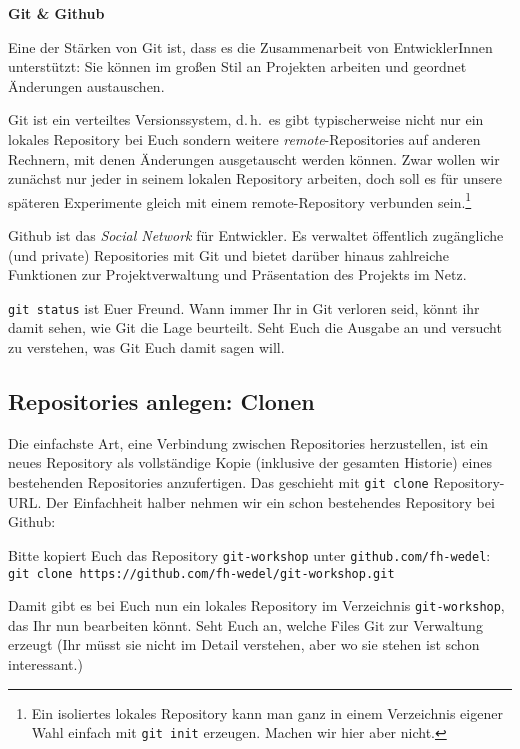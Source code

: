 \documentclass[a4paper, 12pt]{article}
\newcounter{enumisave}
\newenvironment{enumerate*}%
{\begin{enumerate}\setcounter{enumi}{\theenumisave}}%
{\setcounter{enumisave}{\theenumi}\end{enumerate}}
\begin{document}
\centerline{\huge\bf Git \& Github}\bigskip

Eine der Stärken von Git ist, dass es die Zusammenarbeit von 
EntwicklerInnen unterstützt: Sie können im großen Stil an Projekten arbeiten und geordnet Änderungen austauschen.

Git ist ein verteiltes Versionssystem, d.\,h.\ es gibt typischerweise nicht nur
ein lokales Repository bei Euch sondern weitere \emph{remote}-Repositories auf anderen Rechnern, mit denen Änderungen ausgetauscht werden können. Zwar wollen wir zunächst nur jeder in seinem lokalen Repository arbeiten, doch soll es für unsere späteren Experimente gleich mit einem remote-Repository verbunden sein.\footnote{Ein isoliertes lokales Repository kann man ganz in einem Verzeichnis eigener Wahl einfach mit \texttt{git init} erzeugen. Machen wir hier aber nicht.}

Github ist das \emph{Social Network} für Entwickler. Es verwaltet öffentlich zugängliche (und private) Repositories mit Git und bietet darüber hinaus zahlreiche Funktionen zur Projektverwaltung und Präsentation des Projekts im Netz.

\texttt{git status} ist Euer Freund. Wann immer Ihr in Git verloren seid, könnt ihr damit sehen, wie Git die Lage beurteilt. Seht Euch die Ausgabe an und versucht zu verstehen, was Git Euch damit sagen will.



\subsection*{Repositories anlegen: Clonen}\vspace{-1.5ex}
Die einfachste Art, eine Verbindung zwischen Repositories herzustellen, ist ein neues Repository als vollständige Kopie (inklusive der gesamten Historie) eines bestehenden Repositories anzufertigen. Das geschieht mit \texttt{git clone} \textsf{Repository-URL}.
Der Einfachheit halber nehmen wir ein schon bestehendes Repository bei Github:

\begin{enumerate*}
\item Bitte kopiert Euch das Repository \texttt{git-workshop} unter \texttt{github.com/fh-wedel}:\\ \texttt{git clone https://github.com/fh-wedel/git-workshop.git}

Damit gibt es bei Euch nun ein lokales Repository im Verzeichnis \texttt{git-workshop}, das Ihr nun bearbeiten könnt. Seht Euch an, welche Files Git zur Verwaltung erzeugt (Ihr müsst sie nicht im Detail verstehen, aber wo sie stehen ist schon interessant.)
\end{enumerate*}
\end{document}
